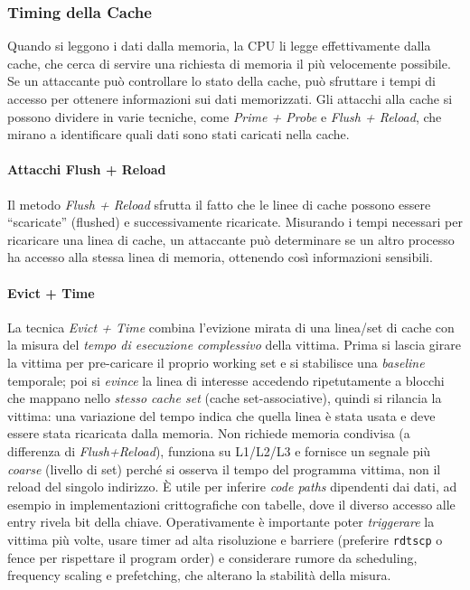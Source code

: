 \subsubsection{Timing della Cache}
Quando si leggono i dati dalla memoria, la CPU li legge effettivamente dalla cache, che cerca di servire una richiesta di memoria il più velocemente possibile. Se un attaccante può controllare lo stato della cache, può sfruttare i tempi di accesso per ottenere informazioni sui dati memorizzati. Gli attacchi alla cache si possono dividere in varie tecniche, come \emph{Prime + Probe} e \emph{Flush + Reload}, che mirano a identificare quali dati sono stati caricati nella cache.

\paragraph{Attacchi Flush + Reload}
Il metodo \emph{Flush + Reload} sfrutta il fatto che le linee di cache possono essere ``scaricate'' (flushed) e successivamente ricaricate. Misurando i tempi necessari per ricaricare una linea di cache, un attaccante può determinare se un altro processo ha accesso alla stessa linea di memoria, ottenendo così informazioni sensibili.


\paragraph{Evict + Time}
La tecnica \emph{Evict + Time} combina l’evizione mirata di una linea/set di cache con la misura del \emph{tempo di esecuzione complessivo} della vittima. Prima si lascia girare la vittima per pre-caricare il proprio working set e si stabilisce una \emph{baseline} temporale; poi si \emph{evince} la linea di interesse accedendo ripetutamente a blocchi che mappano nello \emph{stesso cache set} (cache set-associative), quindi si rilancia la vittima: una variazione del tempo indica che quella linea è stata usata e deve essere stata ricaricata dalla memoria.
Non richiede memoria condivisa (a differenza di \emph{Flush+Reload}), funziona su L1/L2/L3 e fornisce un segnale più \emph{coarse} (livello di set) perché si osserva il tempo del programma vittima, non il reload del singolo indirizzo. È utile per inferire \emph{code paths} dipendenti dai dati, ad esempio in implementazioni crittografiche con tabelle, dove il diverso accesso alle entry rivela bit della chiave.
Operativamente è importante poter \emph{triggerare} la vittima più volte, usare timer ad alta risoluzione e barriere (preferire \texttt{rdtscp} o fence per rispettare il program order) e considerare rumore da scheduling, frequency scaling e prefetching, che alterano la stabilità della misura.


